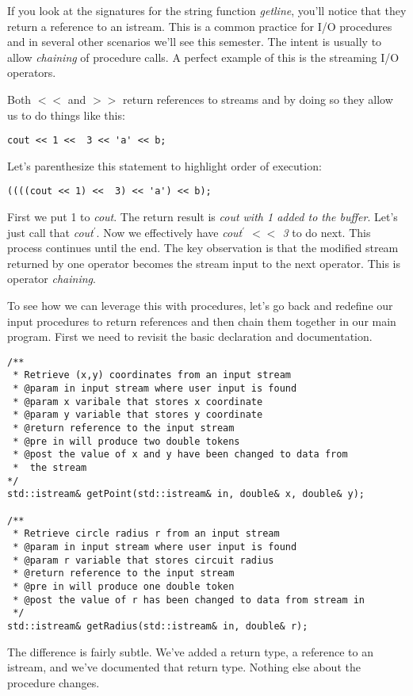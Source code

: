 \documentclass[nobib]{tufte-handout}
\begin{document}
If you look at the signatures for the string function \textit{getline}, you'll notice that they return a reference to an istream. This is a common practice for I/O procedures and in several other scenarios we'll see this semester. The intent is usually to allow \textit{chaining} of procedure calls. A perfect example of this is the streaming I/O operators. 

Both $<<$ and $>>$ return references to streams and by doing so they allow us to do things like this:
\begin{verbatim}
cout << 1 <<  3 << 'a' << b;
\end{verbatim}
Let's parenthesize this statement to highlight order of execution:
\begin{verbatim}
((((cout << 1) <<  3) << 'a') << b);
\end{verbatim}
First we put 1 to \textit{cout}. The return result is \textit{cout with 1 added to the buffer}. Let's just call that \textit{cout$^\prime$}. Now we effectively have \textit{cout$^\prime$ $<<$ 3} to do next. This process continues until the end. The key observation is that the modified stream returned by one operator becomes the stream input to the next operator. This is operator \textit{chaining}. 

To see how we can leverage this with procedures, let's go back and redefine our input procedures to return references and then chain them together in our main program. First we need to revisit the basic declaration and documentation.
\begin{verbatim}
/**
 * Retrieve (x,y) coordinates from an input stream
 * @param in input stream where user input is found
 * @param x varibale that stores x coordinate
 * @param y variable that stores y coordinate
 * @return reference to the input stream
 * @pre in will produce two double tokens
 * @post the value of x and y have been changed to data from
 *  the stream
*/
std::istream& getPoint(std::istream& in, double& x, double& y);

/**
 * Retrieve circle radius r from an input stream
 * @param in input stream where user input is found
 * @param r variable that stores circuit radius
 * @return reference to the input stream
 * @pre in will produce one double token
 * @post the value of r has been changed to data from stream in
 */
std::istream& getRadius(std::istream& in, double& r);
\end{verbatim}
The difference is fairly subtle. We've added a return type, a reference to an istream, and we've documented that return type. Nothing else about the procedure changes. 
\end{document}
